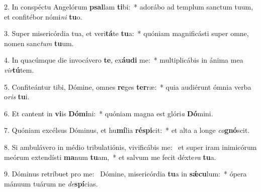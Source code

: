 2. In conspéctu Angelórum \textbf{psal}lam \textbf{ti}bi:~*  adorábo ad templum sanctum tuum, et confitébor nómi\textit{ni} \textbf{tu}o.\

3. Super misericórdia tua, et veri\textbf{tá}te \textbf{tu}a:~*  quóniam magnificásti super omne, nomen sanc\textit{tum} \textbf{tu}um.\

4. In quacúmque die invocávero \textbf{te}, ex\textbf{áu}\textbf{di} me:~*  multiplicábis in ánima mea \textit{vir}\textbf{tú}tem.\

5. Confiteántur tibi, Dómine, omnes \textbf{re}ges \textbf{ter}ræ:~*  quia audiérunt ómnia verba o\textit{ris} \textbf{tu}i.\

6. Et cantent in \textbf{vi}is \textbf{Dó}\textbf{mi}ni:~*  quóniam magna est glóri\textit{a} \textbf{Dó}mini.\

7. Quóniam excélsus Dóminus, et hu\textbf{mí}lia \textbf{ré}\textbf{spi}cit:~*  et alta a longe \textit{co}\textbf{gnó}scit.\

8. Si ambulávero in médio tribulatiónis, vivificábis me: \dag\  et super iram inimicórum meórum extendísti \textbf{ma}num \textbf{tu}am,~*  et salvum me fecit déxte\textit{ra} \textbf{tu}a.\

9. Dóminus retríbuet pro me: \dag\  Dómine, misericórdia \textbf{tu}a in \textbf{sǽ}\textbf{cu}lum:~*  ópera mánuum tuárum ne \textit{de}\textbf{spí}cias.\


